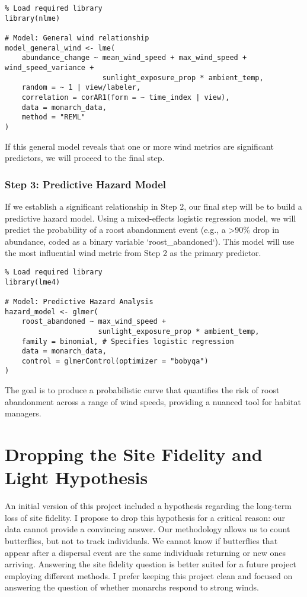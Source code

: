 \begin{verbatim}
% Load required library
library(nlme)

# Model: General wind relationship
model_general_wind <- lme(
    abundance_change ~ mean_wind_speed + max_wind_speed + wind_speed_variance +
                       sunlight_exposure_prop * ambient_temp,
    random = ~ 1 | view/labeler,
    correlation = corAR1(form = ~ time_index | view),
    data = monarch_data,
    method = "REML"
)
\end{verbatim}

If this general model reveals that one or more wind metrics are significant predictors, we will proceed to the final step.

\subsubsection{Step 3: Predictive Hazard Model}

If we establish a significant relationship in Step 2, our final step will be to build a predictive hazard model. Using a mixed-effects logistic regression model, we will predict the probability of a roost abandonment event (e.g., a >90\% drop in abundance, coded as a binary variable `roost_abandoned`). This model will use the most influential wind metric from Step 2 as the primary predictor.

\begin{verbatim}
% Load required library
library(lme4)

# Model: Predictive Hazard Analysis
hazard_model <- glmer(
    roost_abandoned ~ max_wind_speed + 
                      sunlight_exposure_prop * ambient_temp,
    family = binomial, # Specifies logistic regression
    data = monarch_data,
    control = glmerControl(optimizer = "bobyqa")
)
\end{verbatim}

The goal is to produce a probabilistic curve that quantifies the risk of roost abandonment across a range of wind speeds, providing a nuanced tool for habitat managers.

\section{Dropping the Site Fidelity and Light Hypothesis}

An initial version of this project included a hypothesis regarding the long-term loss of site fidelity. I propose to drop this hypothesis for a critical reason: our data cannot provide a convincing answer. Our methodology allows us to count butterflies, but not to track individuals. We cannot know if butterflies that appear after a dispersal event are the same individuals returning or new ones arriving. Answering the site fidelity question is better suited for a future project employing different methods. I prefer keeping this project clean and focused on answering the question of whether monarchs respond to strong winds.

